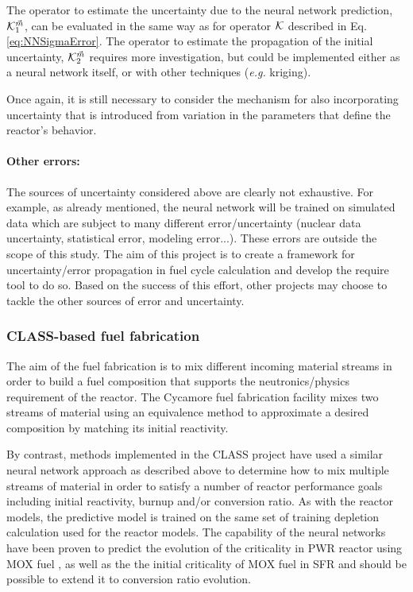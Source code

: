 \documentclass[dvips,12pt]{article}
\begin{document}
The operator to estimate the uncertainty due to
the neural network prediction, ${\cal
  K}_1^{{\vec{m}}}$, can be evaluated in the same way
as for operator ${\cal K}$ described in
Eq.\eqref{eq:NNSigmaError}. The operator to estimate
the propagation of the initial uncertainty,
${\cal K}_2^{{\vec{m}}}$ requires more investigation,
but could be implemented either as a neural
network itself, or with other techniques
(\textit{e.g.} kriging).

Once again, it is still necessary to consider the
mechanism for also incorporating uncertainty that
is introduced from variation in the parameters
that define the reactor's behavior.

\paragraph{Other errors:\\}

The sources of uncertainty considered above are
clearly not exhaustive. For example, as already
mentioned, the neural network will be trained on
simulated data which are subject to many different
error/uncertainty (nuclear data uncertainty,
statistical error, modeling error...).  These
errors are outside the scope of this study.  The
aim of this project is to create a framework for
uncertainty/error propagation in fuel cycle
calculation and develop the require tool to do so.
Based on the success of this effort, other
projects may choose to tackle the other sources of
error and uncertainty.



\subsubsection{CLASS-based fuel fabrication} \label{sec:fabrication}

The aim of the fuel fabrication is to mix
different incoming material streams in order to
build a fuel composition that supports the
neutronics/physics requirement of the reactor. The
Cycamore fuel fabrication facility mixes two
streams of material using an equivalence method to
approximate a desired composition by matching its
initial reactivity.  \cite{cycamore_fab}

By contrast, methods implemented in the CLASS
project have used a similar neural network
approach as described above to determine how to
mix multiple streams of material in order to
satisfy a number of reactor performance goals
including initial reactivity, burnup and/or
conversion ratio. As with the reactor models, the
predictive model is trained on the same set of
training depletion calculation used for the
reactor models. The capability of the neural
networks have been proven to predict the evolution
of the criticality in PWR reactor using MOX fuel
\cite{Leniau.ANE.2015}, as well as
the the initial criticality of MOX fuel in SFR
\cite{CLASS_UserGuide} and should be possible to
extend it to conversion ratio evolution.
\end{document}
